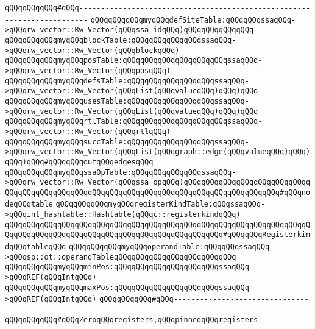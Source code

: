 \verb|qQQqqQQqqQQq#qQQq------------------------------------------------------------------------|\newline
\verb|qQQqqQQqqQQqmyqQQqdefSiteTable:qQQqqQQqssaqQQq->qQQqrw_vector::Rw_Vector(qQQqssa_idqQQq)qQQqqQQqqQQqqQQq|\newline
\verb|qQQqqQQqqQQqmyqQQqblockTable:qQQqqQQqqQQqqQQqssaqQQq->qQQqrw_vector::Rw_Vector(qQQqblockqQQq)|\newline
\verb|qQQqqQQqqQQqmyqQQqposTable:qQQqqQQqqQQqqQQqqQQqqQQqssaqQQq->qQQqrw_vector::Rw_Vector(qQQqposqQQq)|\newline
\verb|qQQqqQQqqQQqmyqQQqdefsTable:qQQqqQQqqQQqqQQqqQQqssaqQQq->qQQqrw_vector::Rw_Vector(qQQqList(qQQqvalueqQQq)qQQq)qQQq|\newline
\verb|qQQqqQQqqQQqmyqQQqusesTable:qQQqqQQqqQQqqQQqqQQqssaqQQq->qQQqrw_vector::Rw_Vector(qQQqList(qQQqvalueqQQq)qQQq)qQQq|\newline
\verb|qQQqqQQqqQQqmyqQQqrtlTable:qQQqqQQqqQQqqQQqqQQqqQQqssaqQQq->qQQqrw_vector::Rw_Vector(qQQqrtlqQQq)|\newline
\verb|qQQqqQQqqQQqmyqQQqsuccTable:qQQqqQQqqQQqqQQqqQQqssaqQQq->qQQqrw_vector::Rw_Vector(qQQqList(qQQqgraph::edge(qQQqvalueqQQq)qQQq)qQQq)qQQq#qQQqqQQqoutqQQqedgesqQQq|\newline
\verb|qQQqqQQqqQQqmyqQQqssaOpTable:qQQqqQQqqQQqqQQqssaqQQq->qQQqrw_vector::Rw_Vector(qQQqssa_opqQQq)qQQqqQQqqQQqqQQqqQQqqQQqqQQqqQQqqQQqqQQqqQQqqQQqqQQqqQQqqQQqqQQqqQQqqQQqqQQqqQQqqQQqqQQqqQQq#qQQqnodeqQQqtable|\newline
\verb|qQQqqQQqqQQqmyqQQqregisterKindTable:qQQqssaqQQq->qQQqint_hashtable::Hashtable(qQQqc::registerkindqQQq)|\newline
\verb|qQQqqQQqqQQqqQQqqQQqqQQqqQQqqQQqqQQqqQQqqQQqqQQqqQQqqQQqqQQqqQQqqQQqqQQqqQQqqQQqqQQqqQQqqQQqqQQqqQQqqQQqqQQqqQQqqQQqqQQq#qQQqqQQqRegisterkindqQQqtableqQQq|\newline
\verb|qQQqqQQqqQQqmyqQQqoperandTable:qQQqqQQqssaqQQq->qQQqsp::ot::operandTableqQQqqQQqqQQqqQQqqQQqqQQqqQQq|\newline
\verb|qQQqqQQqqQQqmyqQQqminPos:qQQqqQQqqQQqqQQqqQQqqQQqssaqQQq->qQQqREF(qQQqIntqQQq)|\newline
\verb|qQQqqQQqqQQqmyqQQqmaxPos:qQQqqQQqqQQqqQQqqQQqqQQqssaqQQq->qQQqREF(qQQqIntqQQq)|\newline
\newline
\verb|qQQqqQQqqQQq#qQQq------------------------------------------------------------------------|\newline
\verb|qQQqqQQqqQQq#qQQqZeroqQQqregisters,qQQqpinnedqQQqregisters|\newline
